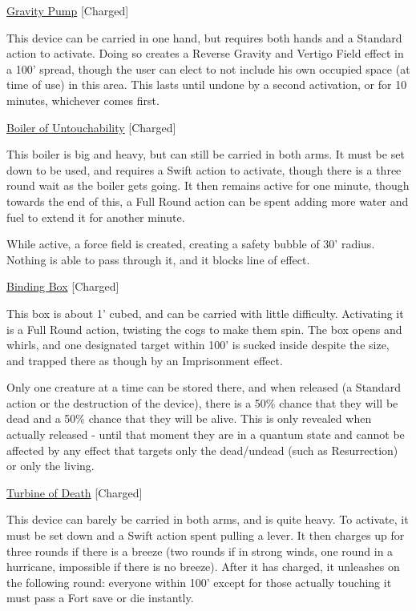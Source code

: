 \medskip\noindent\underline{Gravity Pump} [Charged] 

\noindent This device can be carried in one hand, but requires both hands and a Standard action to activate. Doing so creates a Reverse Gravity and Vertigo Field effect in a 100' spread, though the user can elect to not include his own occupied space (at time of use) in this area. This lasts until undone by a second activation, or for 10 minutes, whichever comes first. 

\medskip\noindent\underline{Boiler of Untouchability} [Charged] 

\noindent This boiler is big and heavy, but can still be carried in both arms. It must be set down to be used, and requires a Swift action to activate, though there is a three round wait as the boiler gets going. It then remains active for one minute, though towards the end of this, a Full Round action can be spent adding more water and fuel to extend it for another minute. 

\smallskip\noindent While active, a force field is created, creating a safety bubble of 30' radius. Nothing is able to pass through it, and it blocks line of effect. 

\medskip\noindent\underline{Binding Box} [Charged] 

\noindent This box is about 1' cubed, and can be carried with little difficulty. Activating it is a Full Round action, twisting the cogs to make them spin. The box opens and whirls, and one designated target within 100' is sucked inside despite the size, and trapped there as though by an Imprisonment effect. 

\smallskip\noindent Only one creature at a time can be stored there, and when released (a Standard action or the destruction of the device), there is a 50\% chance that they will be dead and a 50\% chance that they will be alive. This is only revealed when actually released - until that moment they are in a quantum state and cannot be affected by any effect that targets only the dead/undead (such as Resurrection) or only the living. 

\medskip\noindent\underline{Turbine of Death} [Charged]
 
\noindent This device can barely be carried in both arms, and is quite heavy. To activate, it must be set down and a Swift action spent pulling a lever. It then charges up for three rounds if there is a breeze (two rounds if in strong winds, one round in a hurricane, impossible if there is no breeze). After it has charged, it unleashes on the following round: everyone within 100' except for those actually touching it must pass a Fort save or die instantly. 


